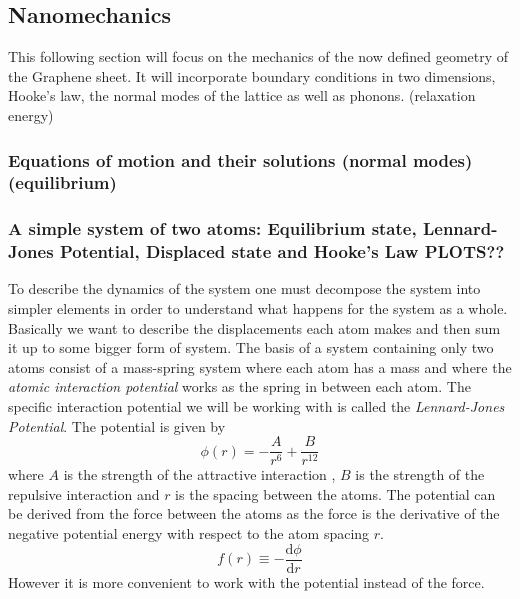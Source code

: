 
\subsection{Nanomechanics}
This following section will focus on the mechanics of the now defined geometry of the Graphene sheet. It will incorporate boundary conditions in two dimensions, Hooke's law, the normal modes of the lattice as well as phonons. (relaxation energy)
\subsubsection{Equations of motion and their solutions (normal modes)(equilibrium)}
\subsubsection{A simple system of two atoms: Equilibrium state, Lennard-Jones Potential, Displaced state and Hooke's Law PLOTS??}
To describe the dynamics of the system one must decompose the system into simpler elements in order to understand what happens for the system as a whole. Basically we want to describe the displacements each atom makes and then sum it up to some bigger form of system. The basis of a system containing only two atoms consist of a mass-spring system where each atom has a mass and where the \textit{atomic interaction potential} works as the spring in between each atom. The specific interaction potential we will be working with is called the \textit{Lennard-Jones Potential}. The potential is given by \begin{equation}
    \phi(r)=-\dfrac{A}{r^{6}}+\dfrac{B}{r^{12}}\label{LJPot}
\end{equation} where $A$ is the strength of the attractive interaction , $B$ is the strength of the repulsive interaction and $r$ is the spacing between the atoms. 
The potential can be derived from the force between the atoms as the force is the derivative of the negative potential energy with respect to the atom spacing $r$.\begin{equation}
    f(r)\equiv -\dfrac{\text{d}\phi}{\text{d}r}
\end{equation} However it is more convenient to work with the potential instead of the force. \\
